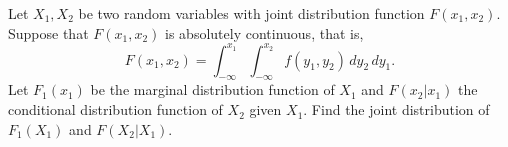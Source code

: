 Let $X_1, X_2$ be two random variables with joint distribution function $F(x_1, x_2)$. Suppose that $F(x_1, x_2)$ is absolutely continuous, that is,
$$F(x_1, x_2) = \int_{-\infty}^{x_1} \int_{-\infty}^{x_2} f(y_1, y_2) \, dy_2 \, dy_1.$$
Let $F_1(x_1)$ be the marginal distribution function of $X_1$ and $F(x_2|x_1)$ the conditional distribution function of $X_2$ given $X_1$. Find the joint distribution of $F_1(X_1)$ and $F(X_2|X_1)$.
